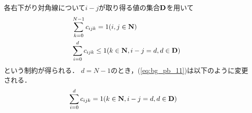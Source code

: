 各右下がり対角線について$i-j$が取り得る値の集合$\bf D$を用いて
\begin{eqnarray}
    & \sum_{k=0}^{N-1} c_{ijk} = 1     (i,j \in {\bf N})    \label{eq:bg_pb_10}\\
    & \sum_{i=0}^{d} c_{ijk} \leq 1  (k \in {\bf N}, i-j=d, d \in {\bf D}) \label{eq:bg_pb_11}
\end{eqnarray}
という制約が得られる．
$d=N-1$のとき，(\ref{eq:bg_pb_11})は以下のように変更される．
\begin{eqnarray}
    & \sum_{i=0}^{d} c_{ijk} = 1  (k \in {\bf N}, i-j=d, d \in {\bf D}) \label{eq:bg_pb_12}
\end{eqnarray}



%
%
%



